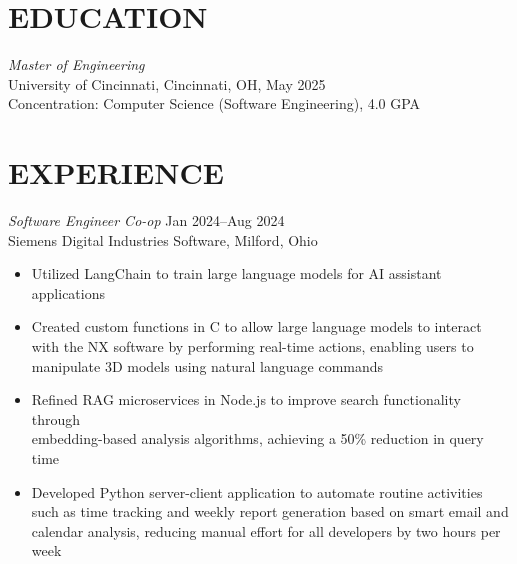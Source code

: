 \documentclass[margin]{res} %
\begin{document}
\begin{resume}
\vspace*{-5.0mm}


\section{EDUCATION}

{\sl Master of Engineering\/}\\
University of Cincinnati, Cincinnati, OH, May 2025 \\
Concentration: Computer Science (Software Engineering), 4.0 GPA

 
\section{EXPERIENCE}
{\sl Software Engineer Co-op\/} \hfill {\color{black} Jan 2024--Aug 2024} \\
Siemens Digital Industries Software, Milford, Ohio
\vspace{1mm}
\begin{itemize}  %
\item Utilized LangChain to train large language models for AI assistant applications 
\item Created custom functions in C to allow large language models to interact with the NX software by performing real-time actions, enabling users to manipulate 3D models using natural language commands 
\item Refined RAG microservices in Node.js to improve search functionality through\\embedding-based analysis algorithms, achieving a 50\% reduction in query time 
\item Developed Python server-client application to automate routine activities such as time tracking and weekly report generation based on smart email and calendar analysis, reducing manual effort for all developers by two hours per week
\end{itemize}



\end{resume}
\end{document}
